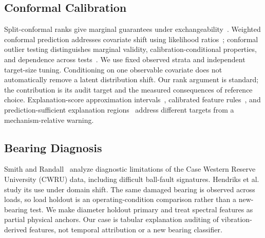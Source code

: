 \documentclass[conference]{IEEEtran}
\begin{document}
\subsection{Conformal Calibration} Split-conformal ranks give marginal guarantees under exchangeability~\cite{angelopoulos2023conformal}. Weighted conformal prediction addresses covariate shift using likelihood ratios~\cite{tibshirani2019shift}; conformal outlier testing distinguishes marginal validity, calibration-conditional properties, and dependence across tests~\cite{bates2023outliers}. We use fixed observed strata and independent target-size tuning. Conditioning on one observable covariate does not automatically remove a latent distribution shift. Our rank argument is standard; the contribution is its audit target and the measured consequences of reference choice. Explanation-score approximation intervals~\cite{alkhatib2023approximating}, calibrated feature rules~\cite{lofstrom2024calibrated}, and prediction-sufficient explanation regions~\cite{alkhatib2026sufficient} address different targets from a mechanism-relative warning.

\subsection{Bearing Diagnosis} Smith and Randall~\cite{smith2015cwru} analyze diagnostic limitations of the Case Western Reserve University (CWRU) data, including difficult ball-fault signatures. Hendriks et al.~\cite{hendriks2022benchmarking} study its use under domain shift. The same damaged bearing is observed across loads, so load holdout is an operating-condition comparison rather than a new-bearing test. We make diameter holdout primary and treat spectral features as partial physical anchors. Our case is tabular explanation auditing of vibration-derived features, not temporal attribution or a new bearing classifier.
\end{document}
